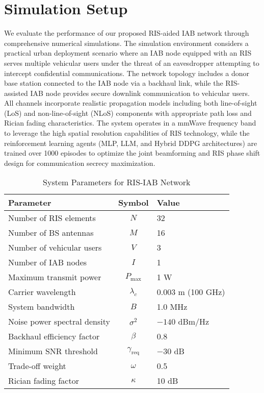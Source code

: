 \section{Simulation Setup}

We evaluate the performance of our proposed RIS-aided IAB network through comprehensive numerical simulations. The simulation environment considers a practical urban deployment scenario where an IAB node equipped with an RIS serves multiple vehicular users under the threat of an eavesdropper attempting to intercept confidential communications. The network topology includes a donor base station connected to the IAB node via a backhaul link, while the RIS-assisted IAB node provides secure downlink communication to vehicular users. All channels incorporate realistic propagation models including both line-of-sight (LoS) and non-line-of-sight (NLoS) components with appropriate path loss and Rician fading characteristics. The system operates in a mmWave frequency band to leverage the high spatial resolution capabilities of RIS technology, while the reinforcement learning agents (MLP, LLM, and Hybrid DDPG architectures) are trained over 1000 episodes to optimize the joint beamforming and RIS phase shift design for communication secrecy maximization.

\begin{table}[!t]
\centering
\caption{System Parameters for RIS-IAB Network}
\label{tab:system_params}
\begin{tabular}{|l|c|l|}
\hline
\textbf{Parameter} & \textbf{Symbol} & \textbf{Value} \\
\hline
Number of RIS elements & $N$ & 32 \\
Number of BS antennas & $M$ & 16 \\
Number of vehicular users & $V$ & 3 \\
Number of IAB nodes & $I$ & 1 \\
Maximum transmit power & $P_{\max}$ & 1 W \\
Carrier wavelength & $\lambda_c$ & 0.003 m (100 GHz) \\
System bandwidth & $B$ & 1.0 MHz \\
Noise power spectral density & $\sigma^2$ & $-140$ dBm/Hz \\
Backhaul efficiency factor & $\beta$ & 0.8 \\
Minimum SNR threshold & $\gamma_{\text{req}}$ & $-30$ dB \\
Trade-off weight & $\omega$ & 0.5 \\
Rician fading factor & $\kappa$ & 10 dB \\
\hline
\end{tabular}
\end{table}

